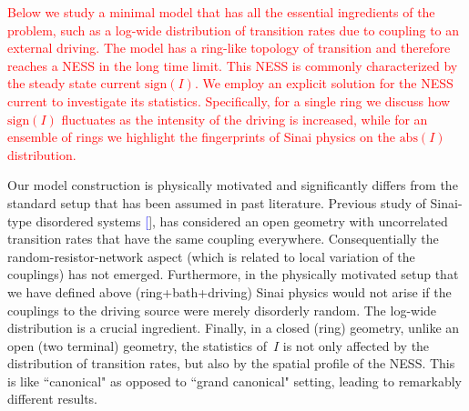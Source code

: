 \documentclass[aps,pre,floats,floatfix,twocolumn]{revtex4}
\newcommand{\rmrk}[1]{\textcolor{red}{#1}}
\renewcommand{\cite}[1]{\textcolor{blue}{[\onlinecite{#1}}]} %
\begin{document}

\rmrk{Below we study a minimal model that has all the essential ingredients
of the problem, such as a log-wide distribution of transition rates
due to coupling to an external driving. The model has a ring-like
topology of transition and therefore reaches a NESS in the long time limit.
This NESS is commonly characterized by the steady state current $\text{sign}(I)$. 
We employ an explicit solution for the NESS current to investigate its statistics.
 Specifically, for a single ring we discuss how $\text{sign}(I)$ fluctuates    
as the intensity of the driving is increased, while for an ensemble 
of rings we highlight the fingerprints of Sinai physics on the $\text{abs}(I)$ distribution. } 



Our model construction is physically motivated and significantly differs 
from the standard setup that has been assumed in past literature. 
Previous study of Sinai-type disordered systems \cite{sinai2}, 
has considered an open geometry with uncorrelated transition rates 
that have the same coupling everywhere. Consequentially 
the random-resistor-network aspect (which is related to local 
variation of the couplings) has not emerged.
%
Furthermore, in the physically motivated setup that we have 
defined above (ring+bath+driving) Sinai physics would not arise 
if the couplings to the driving source were merely disorderly random. 
The log-wide distribution is a crucial ingredient. 
%
Finally, in a closed (ring) geometry, unlike an open (two terminal) geometry, 
the statistics of~$I$ is not only affected by the distribution of transition rates, 
but also by the spatial profile of the NESS. 
This is like ``canonical" as opposed to ``grand canonical" setting, 
leading to remarkably different results.
 
\end{document}
